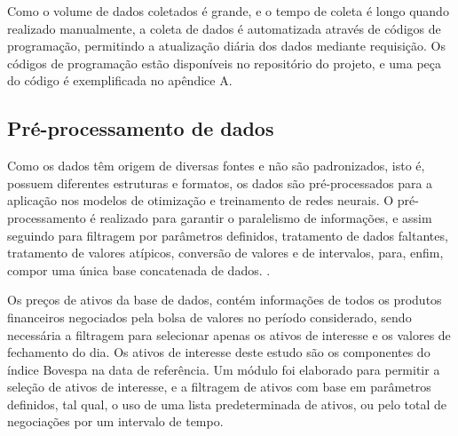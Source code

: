 

        \ipar Como o volume de dados coletados é grande, e o tempo de coleta é longo quando realizado manualmente, a coleta de dados é automatizada através de códigos de programação, permitindo a atualização diária dos dados mediante requisição. Os códigos de programação estão disponíveis no repositório do projeto, e uma peça do código é exemplificada no apêndice A.

    \subsection{Pré-processamento de dados}

        \ipar Como os dados têm origem de diversas fontes e não são padronizados, isto é, possuem diferentes estruturas e formatos, os dados são pré-processados para a aplicação nos modelos de otimização e treinamento de redes neurais. O pré-processamento é realizado para garantir o paralelismo de informações, e assim seguindo para filtragem por parâmetros definidos, tratamento de dados faltantes, tratamento de valores atípicos, conversão de valores e de intervalos, para, enfim, compor uma única base concatenada de dados.
.

        \ipar Os preços de ativos da base de dados, contém informações de todos os produtos financeiros negociados pela bolsa de valores no período considerado, sendo necessária a filtragem para selecionar apenas os ativos de interesse e os valores de fechamento do dia. Os ativos de interesse deste estudo são os componentes do índice Bovespa na data de referência. Um módulo foi elaborado para permitir a seleção de ativos de interesse, e a filtragem de ativos com base em parâmetros definidos, tal qual, o uso de uma lista predeterminada de ativos, ou pelo total de negociações por um intervalo de tempo.

